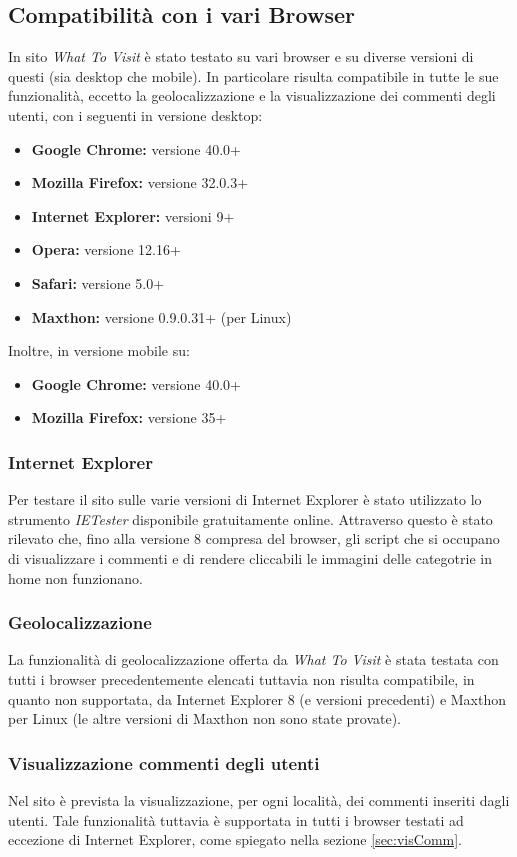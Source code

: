 \subsection{Compatibilità con i vari Browser}
In sito \textit{What To Visit} è stato testato su vari browser e su
diverse versioni di questi (sia desktop che mobile). 
In particolare risulta compatibile in tutte le sue funzionalità, 
eccetto la geolocalizzazione e la visualizzazione dei commenti
degli utenti, con i seguenti in versione desktop:
\begin{itemize}
\item \textbf{Google Chrome:} versione 40.0+ 
\item \textbf{Mozilla Firefox:} versione 32.0.3+
\item \textbf{Internet Explorer:} versioni 9+
\item \textbf{Opera:} versione 12.16+
\item \textbf{Safari:} versione 5.0+
\item \textbf{Maxthon:} versione 0.9.0.31+ (per Linux)
\end{itemize}

Inoltre, in versione mobile su:
\begin{itemize}
\item \textbf{Google Chrome:} versione 40.0+ 
\item \textbf{Mozilla Firefox:} versione 35+  
\end{itemize}

\subsubsection{Internet Explorer}
Per testare il sito sulle varie versioni di Internet Explorer è stato utilizzato lo strumento
\textit{IETester} disponibile gratuitamente online. Attraverso questo è stato rilevato che, fino alla versione 8 compresa del browser, gli script che si occupano di visualizzare i commenti e di rendere cliccabili le immagini delle categotrie in home non funzionano.

\subsubsection{Geolocalizzazione}
La funzionalità di geolocalizzazione offerta da \textit{What To Visit} è stata
testata con tutti i browser precedentemente elencati tuttavia non risulta compatibile,
in quanto non supportata, da Internet Explorer 8 (e versioni precedenti) e Maxthon per Linux (le altre versioni di Maxthon non sono state provate).

\subsubsection{Visualizzazione commenti degli utenti}
Nel sito è prevista la visualizzazione, per ogni località, dei commenti inseriti dagli utenti.
Tale funzionalità tuttavia è supportata in tutti i browser testati ad eccezione di Internet Explorer, come spiegato nella sezione \ref{sec:visComm}.
